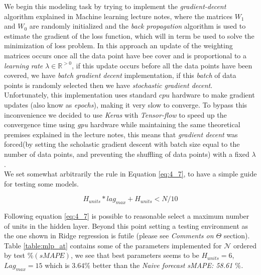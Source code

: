 We begin this modeling task by trying to implement the \emph{gradient-decent} algorithm explained in Machine learning lecture notes, where the matrices $W_{1}$  and $W_{0}$ are randomly initialized and the \emph{back propagation} algorithm is used to estimate the gradient of the loss function, which will in term be used to solve the minimization of loss problem. In this approach an update of the weighting matrices occurs once all the data point have bee cover and is proportional to a \emph{learning rate} $\lambda \in \mathbb{R}^{>0}$, if this update occurs before all the data points have been covered, we have \emph{batch gradient decent} implementation, if this \emph{batch} of data points is randomly selected then we have \emph{stochastic gradient decent}. Unfortunately, this implementation uses standard $cpu$ hardware to make gradient updates (also know as \emph{epochs}), making it very slow to converge. To bypass this inconvenience we decided to use \emph{Keras} with \emph{Tensor-flow}\cite{chollet2015keras} to speed up the convergence time using \emph{gpu} hardware while maintaining the same theoretical premises explained in the lecture notes, this means that \emph{gradient decent} was forced(by setting the scholastic gradient descent with batch size equal to the number of data points, and preventing the shuffling of data points) with a fixed  $\lambda$.\\

We set somewhat arbitrarily the rule in Equation \ref{eq:4_7}, to have a simple guide for testing some models.


\begin{equation}
H_{units}*lag_{max}+H_{units}<N/10
\label{eq:4_7}
\end{equation}

Following equation \ref{eq:4_7} is possible to reasonable select a maximum number of units in the hidden layer. Beyond this point setting a testing environment as the one shown in Ridge regression is futile (please see \textit{Comments on $\Theta$} section). Table \ref{table:mlp_at} contains some of the parameters implemented  for $\mathcal{N}$ ordered by test $\%(sMAPE)$, we see that best parameters seems to be $H_{units}=6$, $Lag_{max}=15$ which is $3.64\%$  better than the \textit{Naive forecast sMAPE: 58.61 $\%$.}


